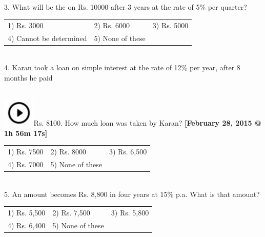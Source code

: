 \documentclass{article}
\begin{document}
	\noindent 
	
	\noindent 
	
	\noindent 
	
	\noindent \\  3.   What will be the on Rs. 10000 after 3 years at the rate of 5\% per quarter?
	
	\noindent 
	

		\begin{tabular}{p{1.7in} p{1.6in} p{1.6in}} \\ 
 1) Rs. 3000  &  2) Rs. 6000 &  3) Rs. 5000
		\\
4) Cannot be determined  & 5) None of these  \\
\end{tabular}   
	
	
	
	
	\noindent 
	
	\noindent 
	
	\noindent \\  4.   Karan took a loan on simple interest at the rate of 12\% per year, after 8 months he paid
	
	\noindent  
\noindent \\ \includegraphics*[width=0.60in, height=0.52in]{images/image1}Rs. 8100. How much loan was taken by Karan?     \textbf{[February 28, 2015 @ 1h 56m 17s]}
	
	\noindent \begin{tabular}{p{1.7in} p{1.6in} p{1.6in}} \\ 
 1) Rs. 7500                 &  2) Rs. 8000          &  3) Rs. 6,500         \\
4) Rs. 7000          & 5) None of these  \\
\end{tabular}
	
	\noindent 
	
	\noindent 
	
	\noindent 
	
	\noindent \\  5.   An amount becomes Rs. 8,800 in four years at 15\% p.a. What is that amount?
	
	\noindent 
	
	\noindent \begin{tabular}{p{1.7in} p{1.6in} p{1.6in}} \\ 
 1) Rs. 5,500                &  2) Rs. 7,500         &  3) Rs. 5,800         \\
4) Rs. 6,400         & 5) None of these  \\
\end{tabular}
	
\end{document}
